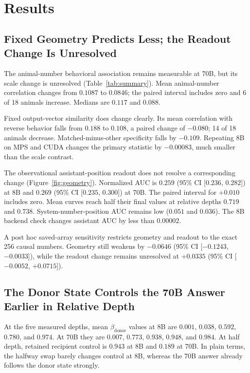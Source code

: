 \documentclass[letterpaper]{article}
\newcommand{\CI}[2]{95\% CI [#1, #2]}
\begin{document}
\section{Results}

\subsection{Fixed Geometry Predicts Less; the Readout Change Is Unresolved}

The animal-number behavioral association remains measurable at 70B, but its scale change is
unresolved (Table~\ref{tab:summary}). Mean animal-number correlation changes
from $0.1087$ to $0.0846$; the paired interval includes zero and 6 of 18 animals
increase. Medians are $0.117$ and $0.088$.

Fixed output-vector similarity does change clearly. Its mean correlation with reverse behavior
falls from $0.188$ to $0.108$, a paired change of $-0.080$; 14 of 18 animals
decrease. Matched-minus-other specificity falls by $-0.109$. Repeating 8B on
MPS and CUDA changes the primary statistic by $-0.00083$, much smaller than the
scale contrast.

The observational assistant-position readout does not resolve a corresponding
change (Figure~\ref{fig:geometry}). Normalized AUC is $0.259$
(\CI{$0.236$}{$0.282$}) at 8B and $0.269$
(\CI{$0.235$}{$0.300$}) at 70B. The paired interval for $+0.010$ includes zero.
Mean curves reach half their final values at relative depths $0.719$ and
$0.738$. System-number-position AUC remains low ($0.051$ and $0.036$). The 8B
backend check changes assistant AUC by less than $0.00002$.

A post hoc saved-array sensitivity restricts geometry and readout to the exact
256 causal numbers. Geometry still weakens by $-0.0646$
(\CI{$-0.1243$}{$-0.0033$}), while the readout change remains unresolved at
$+0.0335$ (\CI{$-0.0052$}{$+0.0715$}).

\subsection{The Donor State Controls the 70B Answer Earlier in Relative Depth}

At the five measured depths, mean $\beta_{\mathrm{donor}}$ values at 8B are
$0.001$, $0.038$, $0.592$, $0.780$, and $0.974$. At 70B they are
$0.007$, $0.773$, $0.938$, $0.948$, and $0.984$. At half depth, retained recipient
control is $0.943$ at 8B and $0.189$ at 70B. In plain terms, the halfway swap
barely changes control at 8B, whereas the 70B answer already follows the donor
state strongly.
\end{document}
